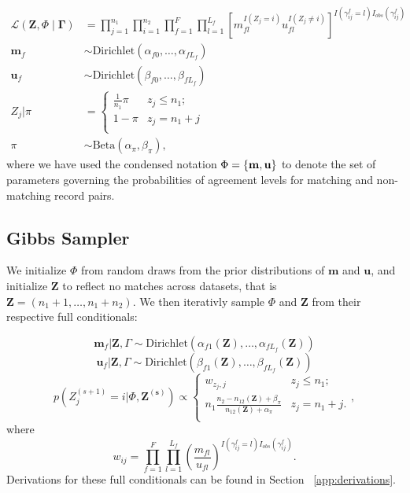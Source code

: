 \documentclass[ba]{imsart}
\begin{document}
\begin{align*}
	\mathcal{L}(\bm{Z}, \Phi \mid \bm{\Gamma}) &= \prod_{j=1}^{n_1}  \prod_{i=1}^{n_2}\prod_{f=1}^{F}\prod_{l=1}^{L_f}\left[  m_{fl}^{I(Z_j = i)}u_{fl}^{I(Z_j \neq i)}\right]^{I(\gamma_{ij}^f = l)I_{obs}(\gamma_{ij}^f)} \\
	\bm{m}_f &\sim \text{Dirichlet}(\alpha_{f0}, \ldots, \alpha_{f L_f}) \\
	\bm{u}_f &\sim \text{Dirichlet}(\beta_{f0}, \ldots, \beta_{f L_f}) \\
	Z_j | \pi &=
	\begin{cases} 
		\frac{1}{n_1}\pi  & z_j \leq n_1; \\
		1-\pi &  z_j  = n_1 + j \\
	\end{cases} \\
	\pi &\sim \text{Beta}(\alpha_{\pi}, \beta_{\pi}),
\end{align*}
where we have used the condensed notation $\Phi = \{\bf{m}, \bf{u}\}$ to denote the set of parameters governing the probabilities of agreement levels for matching and non-matching record pairs. 

\hypertarget{posterior-sampling}{%
	\subsection{Gibbs Sampler}
	\label{gibbs_sampling}}

We initialize $\Phi$ from random draws from the prior distributions of $\bm{m}$ and $\bm{u}$, and initialize $\bm{Z}$ to reflect no matches across datasets, that is $\bm{Z} = (n_1 + 1, \ldots, n_1 + n_2)$. We then iterativly sample $\Phi$ and $\bm{Z}$ from their respective full conditionals:

$$\bm{m}_f|\bm{Z}, \Gamma \sim \text{Dirichlet}(\alpha_{f1}(\bm{Z}), \ldots, \alpha_{fL_f}(\bm{Z}))$$
$$\bm{u}_f|\bm{Z}, \Gamma \sim \text{Dirichlet}(\beta_{f1}(\bm{Z}), \ldots, \beta_{fL_f}(\bm{Z}))$$
$$p\left(Z_j^{(s+1)}  = i| \Phi, \bm{Z^{(s)}}\right) \propto
\begin{cases} 
	w_{z_j, j}  & z_j \leq n_1; \\
	n_1 \frac{n_2 - n_{12}(\bm{Z}) + \beta_{\pi}}{n_{12}(\bm{Z}) + \alpha_{\pi}} & z_j   = n_1 + j. \\
\end{cases},$$
where 
$$w_{ij} = \prod_{f=1}^{F}\prod_{l = 1}^{L_f} \left(\frac{m_{fl}}{u_{fl}}\right)^{I(\gamma_{ij}^f = l)I_{obs}(\gamma_{ij}^f)}.$$
Derivations for these full conditionals can be found in Section ~\ref{app:derivations}.
\end{document}
